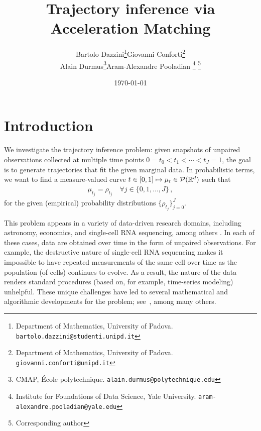 \documentclass[12pt]{article}
\title{Trajectory inference via Acceleration Matching}
\author{
\begin{tabular}{cc}
Bartolo Dazzini\thanks{Department of Mathematics, University of Padova. \texttt{bartolo.dazzini@studenti.unipd.it}}
&
Giovanni Conforti\thanks{Department of Mathematics, University of Padova. \texttt{giovanni.conforti@unipd.it}}
\\[0.6em]
Alain Durmus\thanks{CMAP, \'Ecole polytechnique. \texttt{alain.durmus@polytechnique.edu}}
&
Aram-Alexandre Pooladian
\thanks{Institute for Foundations of Data Science, Yale University. \texttt{aram-alexandre.pooladian@yale.edu}}
\thanks{Corresponding author}
\end{tabular}
}
\date{\today}
\theoremstyle{plain}
\theoremstyle{plain}
\theoremstyle{remark}
\newcommand{\R}{\mathbb{R}}
\newcommand{\ccint}[1]{\left[#1\right]}
\newcommand{\1}{\bm{1}}
\theoremstyle{plain}
\theoremstyle{definition}
\theoremstyle{remark}
\begin{document}
\maketitle
{}


\section{Introduction}
We investigate the trajectory inference problem: given snapshots of unpaired observations collected at multiple time points
$
0=t_0<t_1<\cdots<t_J=1$, the goal is to generate trajectories that fit the given marginal data. In probabilistic terms, we want to find a measure-valued curve $t \in \ccint{0,1} \mapsto \mu_t \in {\cal P}(\R^d)$  such that
\begin{align}\label{eq:marg_constraints}
     \mu_{t_j} = \rho_{t_j} \quad \forall j \in \{0,1,\ldots,J\}\,,
\end{align}
for the given (empirical) probability distributions $\{\rho_{t_j}\}_{j=0}^J$.

This problem appears in a variety of data-driven research domains, including astronomy, economics, and single-cell RNA sequencing, among others \citep{franzke2015stochastic,kazakevivcius2021understanding,yeo2021generative,bunne2022proximal,kubica2007efficient,liounis2020autonomous}. In each of these cases, data are obtained over time in the form of unpaired observations. For example, the destructive nature of single-cell RNA sequencing makes it impossible to have repeated measurements of the same cell over time as the population (of cells) continues to evolve. As a result, the nature of the data renders standard procedures (based on, for example, time-series modeling) unhelpful. These unique challenges have led to several mathematical and algorithmic developments for the problem; see~\citet{lavenant2024toward, hong2025trajectory, bunne2023learning, schiebinger2019optimal}, among many others.
\end{document}
